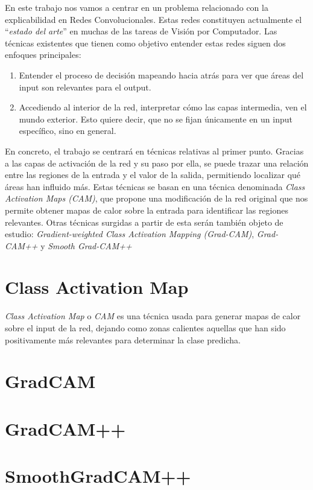 \documentclass[oneside,openright,titlepage,numbers=noenddot,openany,headinclude,footinclude=true,
cleardoublepage=empty,abstractoff,BCOR=5mm,paper=a4,fontsize=12pt,main=spanish]{scrreprt}
\begin{document}
En este trabajo nos vamos a centrar en un problema relacionado con la
explicabilidad en Redes Convolucionales. Estas redes constituyen actualmente el
``\textit{estado del arte}'' en muchas de las tareas de Visión por Computador. Las
técnicas existentes que tienen como objetivo entender estas redes siguen dos
enfoques principales:

\begin{enumerate}
    \item Entender el proceso de decisión mapeando hacia atrás para ver que áreas
    del input son relevantes para el output.
    \item Accediendo al interior de la red, interpretar cómo las capas
    intermedia, ven el mundo exterior. Esto quiere decir, que no se fijan únicamente en un input específico, sino en general.
\end{enumerate}

En concreto, el trabajo se centrará en técnicas relativas al primer punto. Gracias a las capas de activación de la red y su paso por ella, se puede trazar una relación entre las regiones de la entrada y el valor de la salida, permitiendo localizar qué áreas han influido más. Estas técnicas se basan en una técnica denominada \textit{Class Activation Maps (CAM)}, que propone una modificación de la red original que nos permite obtener mapas de calor sobre la entrada para identificar las regiones relevantes. Otras técnicas surgidas a partir de esta serán también objeto de estudio: \textit{Gradient-weighted Class Activation Mapping (Grad-CAM)}, \textit{Grad-CAM++} y \textit{Smooth Grad-CAM++}


\section{Class Activation Map}
\textit{Class Activation Map} o \textit{CAM} es una técnica usada para generar mapas de calor sobre el input de la red, dejando como zonas calientes aquellas que han sido positivamente más relevantes para determinar la clase predicha. 


\section{GradCAM}

\section{GradCAM++}

\section{SmoothGradCAM++}



   
\end{document}
